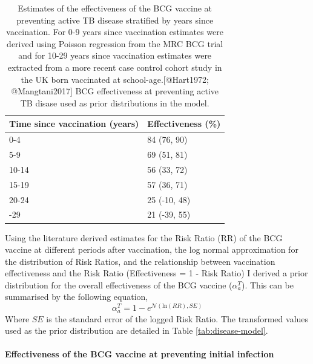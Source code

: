 \documentclass[11pt,twoside]{bristolthesis}
\begin{document}
  \begin{table}[!h]
  
  \caption[Estimates of the effectiveness of the BCG vaccine at preventing active TB disease stratified by years since vaccination.]{\label{tab:bcg-eff-est}Estimates of the effectiveness of the BCG vaccine at preventing active TB disease stratified by years since vaccination. For 0-9 years since vaccination estimates were derived using Poisson regression from the MRC BCG trial and for 10-29 years since vaccination estimates were extracted from a more recent case control cohort study in the UK born vaccinated at school-age.[@Hart1972; @Mangtani2017] BCG effectiveness at preventing active TB disase used as prior distributions in the model.}
  \centering
  \begin{tabular}{ll}
  \toprule
  Time since vaccination (years) & Effectiveness (\%)\\
  \midrule
  0-4 & 84 (76, 90)\\
  5-9 & 69 (51, 81)\\
  10-14 & 56 (33, 72)\\
  15-19 & 57 (36, 71)\\
  20-24 & 25 (-10, 48)\\
  \addlinespace
  25-29 & 21 (-39, 55)\\
  \bottomrule
  \end{tabular}
  \end{table}
  Using the literature derived estimates for the Risk Ratio (RR) of the BCG vaccine at different periods after vaccination, the log normal approximation for the distribution of Risk Ratios, and the relationship between vaccination effectiveness and the Risk Ratio (Effectiveness = 1 - Risk Ratio) I derived a prior distribution for the overall effectiveness of the BCG vaccine (\(\alpha^T_a\)). This can be summarised by the following equation,
  \begin{equation}
    \alpha^T_a = 1 - e^{\mathcal{N}(\text{ln}(RR), SE)}
    \label{eq:rr-to-alpha}
  \end{equation}
  Where \(SE\) is the standard error of the logged Risk Ratio. The transformed values used as the prior distribution are detailed in Table \ref{tab:disease-model}.
  
  \hypertarget{effectiveness-of-the-bcg-vaccine-at-preventing-initial-infection}{%
  \paragraph{Effectiveness of the BCG vaccine at preventing initial infection}\label{effectiveness-of-the-bcg-vaccine-at-preventing-initial-infection}}
  
\end{document}
